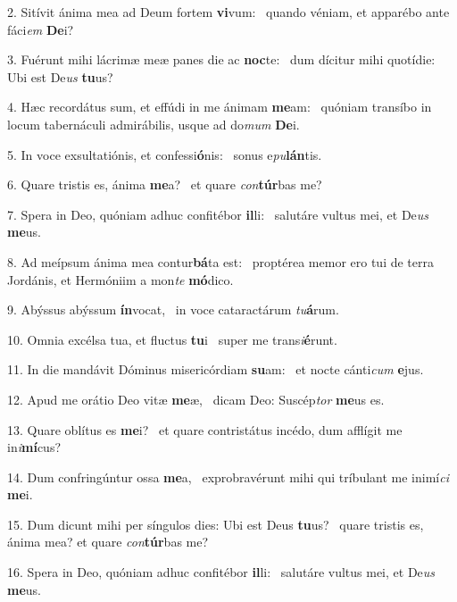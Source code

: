 2. Sitívit ánima mea ad Deum fortem \textbf{vi}vum: \ast\  quando véniam, et apparébo ante fáci\textit{em} \textbf{De}i?\

3. Fuérunt mihi lácrimæ meæ panes die ac \textbf{noc}te: \ast\  dum dícitur mihi quotídie: Ubi est De\textit{us} \textbf{tu}us?\

4. Hæc recordátus sum, et effúdi in me ánimam \textbf{me}am: \ast\  quóniam transíbo in locum tabernáculi admirábilis, usque ad do\textit{mum} \textbf{De}i.\

5. In voce exsultatiónis, et confessi\textbf{ó}nis: \ast\  sonus e\textit{pu}\textbf{lán}tis.\

6. Quare tristis es, ánima \textbf{me}a? \ast\  et quare \textit{con}\textbf{túr}bas me?\

7. Spera in Deo, quóniam adhuc confitébor \textbf{il}li: \ast\  salutáre vultus mei, et De\textit{us} \textbf{me}us.\

8. Ad meípsum ánima mea contur\textbf{bá}ta est: \ast\  proptérea memor ero tui de terra Jordánis, et Hermóniim a mon\textit{te} \textbf{mó}dico.\

9. Abýssus abýssum \textbf{ín}vocat, \ast\  in voce cataractárum \textit{tu}\textbf{á}rum.\

10. Omnia excélsa tua, et fluctus \textbf{tu}i \ast\  super me trans\textit{i}\textbf{é}runt.\

11. In die mandávit Dóminus misericórdiam \textbf{su}am: \ast\  et nocte cánti\textit{cum} \textbf{e}jus.\

12. Apud me orátio Deo vitæ \textbf{me}æ, \ast\  dicam Deo: Suscép\textit{tor} \textbf{me}us es.\

13. Quare oblítus es \textbf{me}i? \ast\  et quare contristátus incédo, dum afflígit me in\textit{i}\textbf{mí}cus?\

14. Dum confringúntur ossa \textbf{me}a, \ast\  exprobravérunt mihi qui tríbulant me inimí\textit{ci} \textbf{me}i.\

15. Dum dicunt mihi per síngulos dies: Ubi est Deus \textbf{tu}us? \ast\  quare tristis es, ánima mea? et quare \textit{con}\textbf{túr}bas me?\

16. Spera in Deo, quóniam adhuc confitébor \textbf{il}li: \ast\  salutáre vultus mei, et De\textit{us} \textbf{me}us.\

